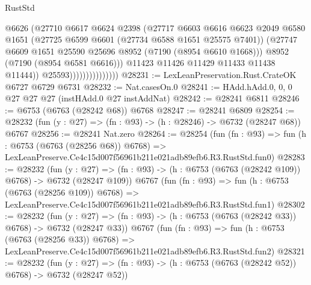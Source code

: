 \begin{lexlean}{RustStd}
\begin{coremodule}
                                    @6626
                                    (@27710
                                      @6617
                                      @6624
                                      @2398
                                      (@27717
                                        @6603
                                        @6616
                                        @6623
                                        @2049
                                        @6580
                                        @1651
                                        (@27725 @6599 @6601 (@27734 @6588 @1651 @25575 @7401))
                                        (@27747
                                          @6609
                                          @1651
                                          @25590
                                          @25696
                                          @8952
                                          (@7190 (@8954 @6610 @1668)))
                                        @8952
                                        (@7190 (@8954 @6581 @6616)))
                                      @11423
                                      @11426
                                      @11429
                                      @11433
                                      @11438
                                      @11444))
                                  @25593)))))))))))))))
@28231 := LexLeanPreservation.Rust.CrateOK @6727 @6729 @6731
@28232 := Nat.casesOn.{0}
@28241 := HAdd.hAdd.{0, 0, 0} @27 @27 @27 (instHAdd.{0} @27 instAddNat)
@28242 := @28241 @6811
@28246 := @6753 (@6763 (@28242 @68)) @6768
@28247 := @28241 @6809
@28254 := @28232 (fun (y : @27) => (fn : @93) -> (h : @28246) -> @6732 (@28247 @68)) @6767
@28256 := @28241 Nat.zero
@28264 := @28254
    (fun (fn : @93) =>
    fun (h : @6753 (@6763 (@28256 @68)) @6768) =>
    LexLeanPreserve.Ce4c15d007f56961b211e021adb89efb6.R3.RustStd.fun0)
@28283 := @28232
    (fun (y : @27) => (fn : @93) -> (h : @6753 (@6763 (@28242 @109)) @6768) -> @6732 (@28247 @109))
    @6767
    (fun (fn : @93) =>
    fun (h : @6753 (@6763 (@28256 @109)) @6768) =>
    LexLeanPreserve.Ce4c15d007f56961b211e021adb89efb6.R3.RustStd.fun1)
@28302 := @28232
    (fun (y : @27) => (fn : @93) -> (h : @6753 (@6763 (@28242 @33)) @6768) -> @6732 (@28247 @33))
    @6767
    (fun (fn : @93) =>
    fun (h : @6753 (@6763 (@28256 @33)) @6768) =>
    LexLeanPreserve.Ce4c15d007f56961b211e021adb89efb6.R3.RustStd.fun2)
@28321 := @28232
    (fun (y : @27) => (fn : @93) -> (h : @6753 (@6763 (@28242 @52)) @6768) -> @6732 (@28247 @52))

\end{coremodule}
\end{lexlean}

